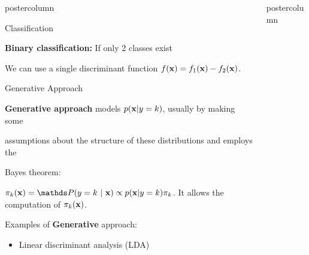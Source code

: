 \documentclass{beamer}
\begin{document}
\begin{frame}[fragile]{}
\begin{columns}
\begin{column}{.31\textwidth}
\begin{beamercolorbox}[center]{postercolumn}
\begin{minipage}{.98\textwidth}
{\begin{myblock}{Classification}
			    \vspace*{1ex}
			
						\begin{codebox}
							 \textbf{Binary classification: }If only 2 classes exist
						\end{codebox}
						\hspace*{1ex}We can use a single discriminant function $f(\mathbf{x}) = f_{1}(\mathbf{x}) - f_{2}(\mathbf{x})$.
          \end{myblock}
\begin{myblock}{Generative Approach}
\begin{codebox}
\textbf{Generative approach} models $p(\mathbf{x} | y= k)$, usually by making some
\end{codebox}

\begin{codebox}
assumptions about the structure of these distributions and employs the
\end{codebox}

\begin{codebox}
Bayes theorem:
  \end{codebox}
\hspace*{1ex}$\pikx = \postk \propto \pdfxyk \pik$. It allows the computation of \hspace*{1ex}$\pi_{k}(\mathbf{x})$.

\begin{codebox}
  Examples of \textbf{Generative} approach:
    \end{codebox}
  
  \begin{itemize}[$\bullet$]     
  \setlength{\itemindent}{+.3in}
    \item Linear discriminant analysis (LDA)
  \end{itemize}
					\end{myblock}\vfill
				}
			\end{minipage}
		\end{beamercolorbox}
	\end{column}
	
	\begin{column}{.31\textwidth}
	\begin{beamercolorbox}[center]{postercolumn}
	
	\begin{minipage}{.98\textwidth}
\parbox[t][\columnheight]{\textwidth}{
  \begin{myblock}{}
  
  

\end{myblock}}
\end{minipage}
\end{beamercolorbox}
\end{column}
\end{columns}
\end{frame}
\end{document}

